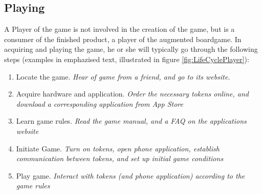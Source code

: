 \subsection{Playing}
A Player of the game is not involved in the creation of the game, but is a consumer of the finished product, a player of the augmented boardgame. In acquiring and playing the game, he or she will typically go through the following steps (examples in emphazised text, illustrated in figure \ref{fig:LifeCyclePlayer}):
\begin{enumerate} \label{play_cycle}
\item Locate the game. \emph{Hear of game from a friend, and go to its website.}
\item Acquire hardware and application. \emph{Order the necessary tokens online, and download a corresponding application from App Store}
\item Learn game rules. \emph{Read the game manual, and a FAQ on the applications website}
\item Initiate Game. \emph{Turn on tokens, open phone application, establish communication between tokens, and set up initial game conditions}
\item Play game. \emph{Interact with tokens (and phone application) according to the game rules}
\end{enumerate}



